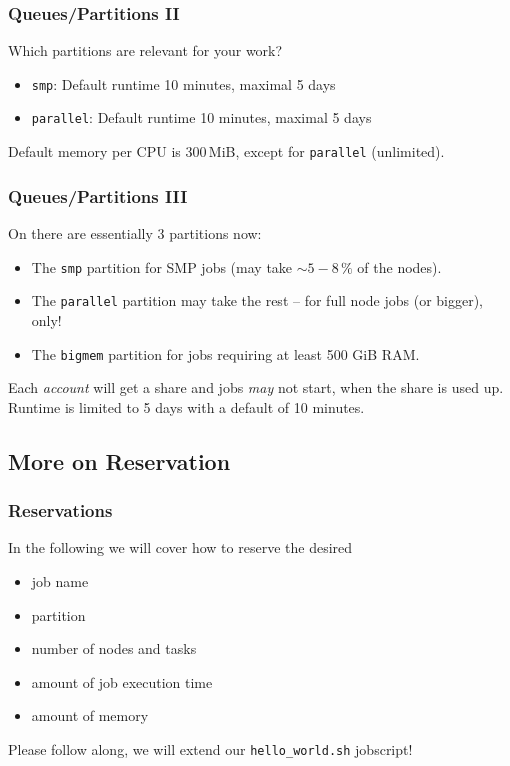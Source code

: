 \begin{frame}[fragile]
  \frametitle{Queues/Partitions II}
  Which partitions are relevant for your work?
  \begin{exampleblock}{\mogonII}
    \begin{itemize}
    \item \verb+smp+: Default runtime 10 minutes, maximal 5 days
    \item \verb+parallel+: Default runtime  10 minutes, maximal 5 days
    \end{itemize}
  \end{exampleblock}
  Default memory per CPU is 300\,MiB, except for \verb+parallel+ (unlimited). 
  \vfill
\end{frame}

\begin{frame}
  \frametitle{Queues/Partitions III}
  \vspace{-0.5em}
  On \mogonII there are essentially 3 partitions now:
  \begin{itemize}[<+->]
   \item The \texttt{smp} partition for SMP jobs (may take $\sim 5-8\,\%$ of the nodes).
   \item The \texttt{parallel} partition may take the rest -- for full node jobs (or bigger), only!
   \item The \texttt{bigmem} partition for jobs requiring at least 500 GiB RAM.
  \end{itemize}
  \pause
  Each \emph{account} will get a share and jobs \emph{may} not start, when the share is used up.
  \pause
  Runtime is limited to 5 days with a default of 10 minutes.
  \vfill
\end{frame}

\subsection*{More on Reservation}

\begin{frame}[fragile]%
  \frametitle{Reservations}
  In the following we will cover how to reserve the desired
  \begin{itemize}
  \item job name
  \item partition
  \item number of nodes and tasks
  \item amount of job execution time
  \item amount of memory
  \end{itemize}
  Please follow along, we will extend our \verb+hello_world.sh+ jobscript!
  \vfill
\end{frame}

